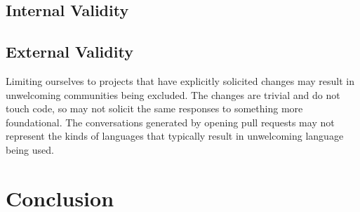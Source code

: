 \documentclass[journal,12pt,onecolumn,]{IEEEtran}
\begin{document}
\subsection{Internal Validity}

\subsection{External Validity}

Limiting ourselves to projects that have explicitly solicited changes may result in unwelcoming communities being excluded.
The changes are trivial and do not touch code, so may not solicit the same responses to something more foundational.
The conversations generated by opening pull requests may not represent the kinds of languages that typically result in unwelcoming language being used.

\section{Conclusion}
%



\end{document}
